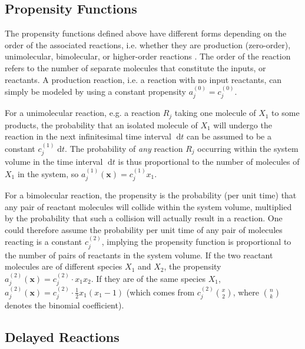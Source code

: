 \documentclass[english,letterpaper,12pt]{article}
\newcommand{\dee}{\;\mathrm{d}}
\renewcommand{\vec}[1]{\ensuremath{\mathbf{#1}}}
\begin{document}
\begin{doublespacing}
\subsection{Propensity Functions} %
\label{sub:propensities}

The propensity functions defined above have different forms depending on the order of the associated reactions, i.e. whether they are production (zero-order), unimolecular, bimolecular, or higher-order reactions \cite{gillespie-ssa}. The order of the reaction refers to the number of separate molecules that constitute the inputs, or reactants. A production reaction, i.e. a reaction with no input reactants, can simply be modeled by using a constant propensity $a_j^{(0)} = c_j^{(0)}$. 

For a unimolecular reaction, e.g. a reaction $R_j$ taking one molecule of $X_1$ to some products, the probability that an isolated molecule of $X_1$ will undergo the reaction in the next infinitesimal time interval $\dee t$ can be assumed to be a constant $c_j^{(1)} \dee t$. The probability of \emph{any} reaction $R_j$ occurring within the system volume in the time interval $\dee t$ is thus proportional to the number of molecules of $X_1$ in the system, so $a_j^{(1)}(\vec{x}) = c_j^{(1)} x_1$.

For a bimolecular reaction, the propensity is the probability (per unit time) that any pair of reactant molecules will collide within the system volume, multiplied by the probability that such a collision will actually result in a reaction. One could therefore assume the probability per unit time of any pair of molecules reacting is a constant $c_j^{(2)}$, implying the propensity function is proportional to the number of pairs of reactants in the system volume. If the two reactant molecules are of different species $X_1$ and $X_2$, the propensity $a_j^{(2)}(\vec{x}) = c_j^{(2)} \cdot x_1 x_2$. If they are of the same species $X_1$, $a_j^{(2)}(\vec{x}) = c_j^{(2)} \cdot \frac{1}{2}x_1(x_1 - 1)$ (which comes from $c_j^{(2)}\binom{x}{2}$, where $\binom{n}{k}$ denotes the binomial coefficient).



\subsection{Delayed Reactions} %
\label{sub:delayed-reactions}


\end{doublespacing}
\end{document}
